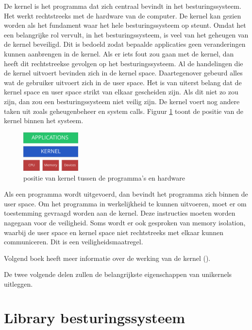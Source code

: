 De kernel is het programma dat zich centraal bevindt in het besturingssysteem. Het werkt rechtstreeks met de hardware van de computer. De kernel kan gezien worden als het fundament waar het hele besturingssysteem op steunt. Omdat het een belangrijke rol vervult, in het besturingssysteem, is veel van het geheugen van de kernel beveiligd. Dit is bedoeld zodat bepaalde applicaties geen veranderingen kunnen aanbrengen in de kernel. Als er iets fout zou gaan met de kernel, dan heeft dit rechtstreekse gevolgen op het besturingssysteem. Al de handelingen die de kernel uitvoert bevinden zich in de kernel space. Daartegenover gebeurd alles wat de gebruiker uitvoert zich in de user space. Het is van uiterst belang dat de kernel space en user space strikt van elkaar gescheiden zijn. Als dit niet zo zou zijn, dan zou een besturingssysteem niet veilig zijn. De kernel voert nog andere taken uit zoals geheugenbeheer en system calls. Figuur \ref{fig:kernel} toont de positie van de kernel binnen het systeem.

\begin{figure}
    \centering
    \includegraphics[width=3cm]{img/kernel}
    \caption{positie van kernel tussen de programma's en hardware}
    \label{fig:kernel}
\end{figure}

Als een programma wordt uitgevoerd, dan bevindt het programma zich binnen de user space. Om het programma in werkelijkheid te kunnen uitvoeren, moet er om toestemming gevraagd worden aan de kernel. Deze instructies moeten worden nagegaan voor de veiligheid. Soms wordt er ook gesproken van memory isolation, waarbij de user space en kernel space niet rechtstreeks met elkaar kunnen communiceren. Dit is een veiligheidsmaatregel.

Volgend boek heeft meer informatie over de werking van de kernel (\cite{bovet_understanding_2005}).

De twee volgende delen zullen de belangrijkste eigenschappen van unikernels uitleggen.

\section{Library besturingssysteem}

